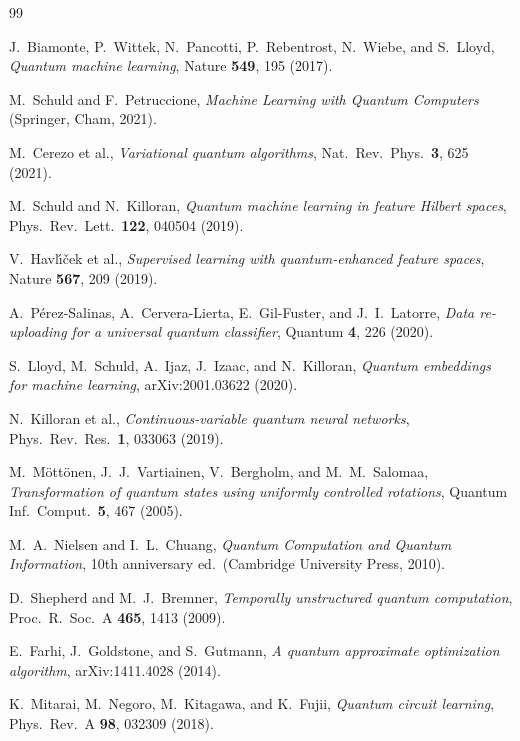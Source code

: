 \documentclass[twocolumn,aps,pra,superscriptaddress,floatfix]{revtex4-2}
\begin{document}
\begin{thebibliography}{99}

J.~Biamonte, P.~Wittek, N.~Pancotti, P.~Rebentrost, N.~Wiebe, and S.~Lloyd,
\textit{Quantum machine learning},
Nature \textbf{549}, 195 (2017).

M.~Schuld and F.~Petruccione,
\textit{Machine Learning with Quantum Computers}
(Springer, Cham, 2021).

M.~Cerezo et al.,
\textit{Variational quantum algorithms},
Nat.\ Rev.\ Phys.\ \textbf{3}, 625 (2021).

M.~Schuld and N.~Killoran,
\textit{Quantum machine learning in feature Hilbert spaces},
Phys.\ Rev.\ Lett.\ \textbf{122}, 040504 (2019).

V.~Havl\'{\i}\v{c}ek et al.,
\textit{Supervised learning with quantum-enhanced feature spaces},
Nature \textbf{567}, 209 (2019).

A.~P\'{e}rez-Salinas, A.~Cervera-Lierta, E.~Gil-Fuster, and J.~I.~Latorre,
\textit{Data re-uploading for a universal quantum classifier},
Quantum \textbf{4}, 226 (2020).

S.~Lloyd, M.~Schuld, A.~Ijaz, J.~Izaac, and N.~Killoran,
\textit{Quantum embeddings for machine learning},
arXiv:2001.03622 (2020).

N.~Killoran et al.,
\textit{Continuous-variable quantum neural networks},
Phys.\ Rev.\ Res.\ \textbf{1}, 033063 (2019).

M.~M\"{o}tt\"{o}nen, J.~J.~Vartiainen, V.~Bergholm, and M.~M.~Salomaa,
\textit{Transformation of quantum states using uniformly controlled rotations},
Quantum Inf.\ Comput.\ \textbf{5}, 467 (2005).

M.~A.~Nielsen and I.~L.~Chuang,
\textit{Quantum Computation and Quantum Information},
10th anniversary ed.\ (Cambridge University Press, 2010).

D.~Shepherd and M.~J.~Bremner,
\textit{Temporally unstructured quantum computation},
Proc.\ R.\ Soc.\ A \textbf{465}, 1413 (2009).

E.~Farhi, J.~Goldstone, and S.~Gutmann,
\textit{A quantum approximate optimization algorithm},
arXiv:1411.4028 (2014).

K.~Mitarai, M.~Negoro, M.~Kitagawa, and K.~Fujii,
\textit{Quantum circuit learning},
Phys.\ Rev.\ A \textbf{98}, 032309 (2018).


\end{thebibliography}
\end{document}
